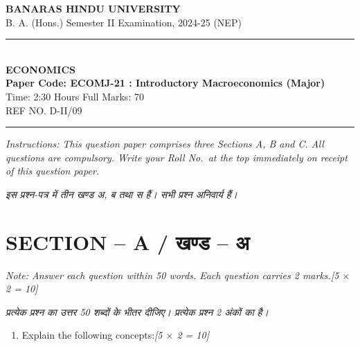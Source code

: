 \documentclass[11pt,a4paper]{article}
\newcommand{\pts}[1]{\hfill \textit{[#1]}}
\begin{document}
\begin{center}
  {\large\bfseries BANARAS HINDU UNIVERSITY}\\[2pt]
  {\normalsize B. A. (Hons.) Semester II Examination, 2024-25 (NEP)}\\[6pt]
  \rule{0.8\linewidth}{0.5pt}\\[6pt]
  {\large\bfseries ECONOMICS}\\[4pt]
  {\large\bfseries Paper Code: ECOMJ-21 : Introductory Macroeconomics (Major)}\\[4pt]
  {\normalsize Time: 2:30 Hours \hfill Full Marks: 70}\\[2pt]
  {\small REF NO. D-II/09}
\end{center}
\rule{\linewidth}{0.4pt}
\smallskip

\noindent \textit{Instructions: This question paper comprises three Sections A, B and C. All questions are compulsory. Write your Roll No.\ at the top immediately on receipt of this question paper.}

\smallskip
\noindent \textit{इस प्रश्न-पत्र में तीन खण्ड अ, ब तथा स हैं। सभी प्रश्न अनिवार्य हैं।}

\bigskip

\section*{SECTION -- A / खण्ड -- अ}
\noindent \textit{Note: Answer each question within 50 words. Each question carries 2 marks.}\pts{5 $\times$ 2 = 10}

\noindent \textit{प्रत्येक प्रश्न का उत्तर 50 शब्दों के भीतर दीजिए। प्रत्येक प्रश्न 2 अंकों का है।}

\begin{enumerate}[label=\textbf{\arabic*.},leftmargin=*,itemsep=8pt]
  \item Explain the following concepts:\pts{5 $\times$ 2 = 10}
\end{enumerate}
\end{document}
